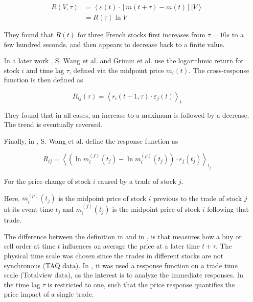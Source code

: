 \begin{align}\label{eq:prop_order_book}
    R \left(V, \tau\right) &= \left\langle \varepsilon \left(t\right) \cdot
    \left[m \left(t + \tau\right) - m \left(t\right)\right] |V \right\rangle \\
    &= R \left(\tau\right) \ln V
\end{align}

They found that $R \left(t\right)$ for three French stocks first increases
from $\tau = 10s$ to a few hundred seconds, and then appears to decrease back
to a finite value.

In a later work \cite{spread_changes_affect,Wang_2016_cross}, S. Wang et al.
and Grimm et al. use the logarithmic return for stock $i$ and time lag $\tau$,
defined via the midpoint price $m_{i} \left( t \right)$. The cross-response
function is then defined as

\begin{equation}\label{eq:Wang_2016}
    R_{ij}\left(\tau\right)=\left\langle r_{i}\left(t-1,\tau\right)\cdot
    \varepsilon_{j} \left(t\right) \right\rangle _{t}
\end{equation}

They found that in all cases, an increase  to a maximum is followed by a
decrease. The trend is eventually reversed.

Finally, in \cite{Wang_2018_b}, S. Wang et al. define the response function as

\begin{equation}\label{eq:Wang_2018_b}
    R_{ij} = \left\langle \left(\ln m_{i}^{\left(f\right)}\left(t_{j}\right)-
    \ln m_{i}^{\left(p\right)} \left(t_{j}\right) \right)\cdot\varepsilon_{j}
    \left(t_{j}\right)\right\rangle _{t_{j}}
\end{equation}

For the price change of stock $i$ caused by a trade of stock $j$.

Here, $m_{i}^{\left(p\right)}\left(t_{j}\right)$ is the midpoint price of stock
$i$ previous to the trade of stock $j$ at its event time $t_j$ and
$m_{i}^{\left(f\right)}\left(t_{j}\right)$ is the midpoint price of stock $i$
following that trade.

The difference between the definition in \cite{Wang_2016_cross} and in
\cite{Wang_2018_b}, is that \cite{Wang_2016_cross} measures how a buy or sell
order at time $t$ influences on average the price at a later time $t + \tau$.
The physical time scale was chosen since the trades in different stocks are not
synchronous (TAQ data). In \cite{Wang_2018_b}, it was used a response function
on a trade time scale (Totalview data), as the interest is to analyze the
immediate responses. In \cite{Wang_2018_b} the time lag $\tau$ is restricted to
one, such that the price response quantifies the price impact of a single
trade.
